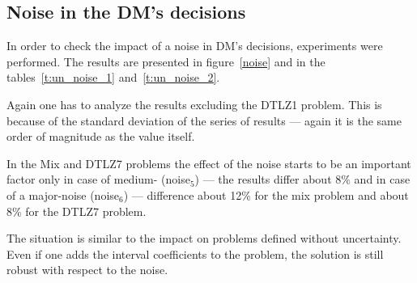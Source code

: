 \clearpage{}

\subsection{Noise in the DM's decisions}

In order to check the impact of a noise in DM's decisions, experiments were
performed. The results are presented in figure~\ref{noise} and in the
tables~\ref{t:un_noise_1} and~\ref{t:un_noise_2}.

Again one has to analyze the results excluding the DTLZ1 problem. This is
because of the standard deviation of the series of results --- again it is the
same order of magnitude as the value itself.

In the Mix and DTLZ7 problems the effect of the noise starts to be an
important factor only in case of medium- (noise$_5$) --- the results differ
about $8\%$ and in case of a major-noise (noise$_6$) --- difference about 12\%
for the mix problem and about 8\% for the DTLZ7 problem.

The situation is similar to the impact on problems defined without
uncertainty. Even if one adds the interval coefficients to the problem, the
solution is still robust with respect to the noise.


